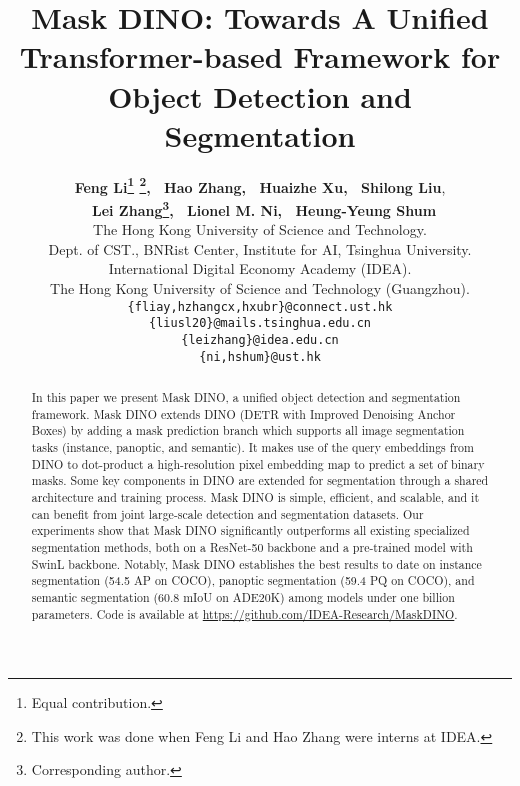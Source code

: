 \documentclass[10pt,twocolumn,letterpaper]{article}
\begin{document}
\title{Mask DINO: Towards A Unified Transformer-based Framework for Object Detection and Segmentation}

\author{\textbf{Feng Li\thanks{Equal contribution.}\hspace{.4mm} \thanks{This work was done when Feng Li and Hao Zhang were interns at IDEA. }\hspace{1.5mm}, ~Hao Zhang, ~Huaizhe Xu, ~Shilong Liu},\\ \textbf{~Lei Zhang\thanks{Corresponding author.}\hspace{1.mm}, ~Lionel M. Ni, ~Heung-Yeung Shum} \\
The Hong Kong University of Science and Technology. \\
Dept. of CST., BNRist Center, Institute for AI, Tsinghua University. \\
International Digital Economy Academy (IDEA). \\
The Hong Kong University of Science and Technology (Guangzhou).\\
\texttt{\{fliay,hzhangcx,hxubr\}@connect.ust.hk} \\
\texttt{\{liusl20\}@mails.tsinghua.edu.cn} \\
\texttt{\{leizhang\}@idea.edu.cn} \\
\texttt{\{ni,hshum\}@ust.hk} \\
}
\maketitle


\begin{abstract}
In this paper we present Mask DINO, a unified object detection and segmentation framework. 
Mask DINO extends DINO (DETR with Improved Denoising Anchor Boxes) by adding a mask prediction branch which supports all image segmentation tasks (instance, panoptic, and semantic). 
It makes use of the query embeddings from DINO to dot-product a high-resolution pixel embedding map to predict a set of binary masks. 
Some key components in DINO are extended for segmentation through a shared architecture and training process. 
Mask DINO is simple, efficient, and scalable, and it can benefit from joint large-scale detection and segmentation datasets. 
Our experiments show that Mask DINO significantly outperforms all existing specialized segmentation methods, both on a ResNet-50 backbone and a pre-trained model with SwinL backbone. 
Notably, Mask DINO establishes the best results to date on instance segmentation (54.5 AP on COCO), panoptic segmentation (59.4 PQ on COCO), and semantic segmentation (60.8 mIoU on ADE20K) among models under one billion parameters. 
Code is available at \url{https://github.com/IDEA-Research/MaskDINO}.

\end{abstract}
\end{document}
